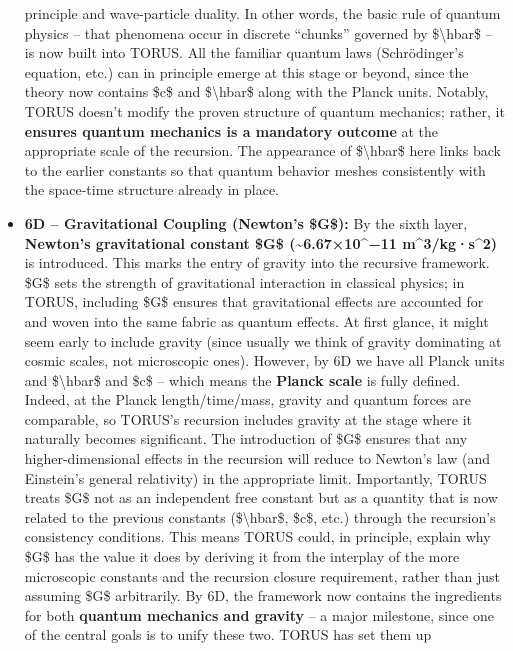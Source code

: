 \begin{itemize}
  principle and wave-particle duality. In other words, the basic rule of
  quantum physics -- that phenomena occur in discrete ``chunks''
  governed by \$\textbackslash{}hbar\$ -- is now built into TORUS. All
  the familiar quantum laws (Schrödinger's equation, etc.) can in
  principle emerge at this stage or beyond, since the theory now
  contains \$c\$ and \$\textbackslash{}hbar\$ along with the Planck
  units. Notably, TORUS doesn't modify the proven structure of quantum
  mechanics; rather, it \textbf{ensures quantum mechanics is a mandatory
  outcome} at the appropriate scale of the recursion. The appearance of
  \$\textbackslash{}hbar\$ here links back to the earlier constants so
  that quantum behavior meshes consistently with the space-time
  structure already in place.
\item
  \textbf{6D -- Gravitational Coupling (Newton's \$G\$):} By the sixth
  layer, \textbf{Newton's gravitational constant \$G\$
  (\textasciitilde{}6.67×10\^{}−11 m\^{}3/kg·s\^{}2)} is introduced.
  This marks the entry of gravity into the recursive framework. \$G\$
  sets the strength of gravitational interaction in classical physics;
  in TORUS, including \$G\$ ensures that gravitational effects are
  accounted for and woven into the same fabric as quantum effects. At
  first glance, it might seem early to include gravity (since usually we
  think of gravity dominating at cosmic scales, not microscopic ones).
  However, by 6D we have all Planck units and \$\textbackslash{}hbar\$
  and \$c\$ -- which means the \textbf{Planck scale} is fully defined.
  Indeed, at the Planck length/time/mass, gravity and quantum forces are
  comparable, so TORUS's recursion includes gravity at the stage where
  it naturally becomes significant. The introduction of \$G\$ ensures
  that any higher-dimensional effects in the recursion will reduce to
  Newton's law (and Einstein's general relativity) in the appropriate
  limit. Importantly, TORUS treats \$G\$ not as an independent free
  constant but as a quantity that is now related to the previous
  constants (\$\textbackslash{}hbar\$, \$c\$, etc.) through the
  recursion's consistency conditions. This means TORUS could, in
  principle, explain why \$G\$ has the value it does by deriving it from
  the interplay of the more microscopic constants and the recursion
  closure requirement, rather than just assuming \$G\$ arbitrarily. By
  6D, the framework now contains the ingredients for both
  \textbf{quantum mechanics and gravity} -- a major milestone, since one
  of the central goals is to unify these two. TORUS has set them up

\end{itemize}
